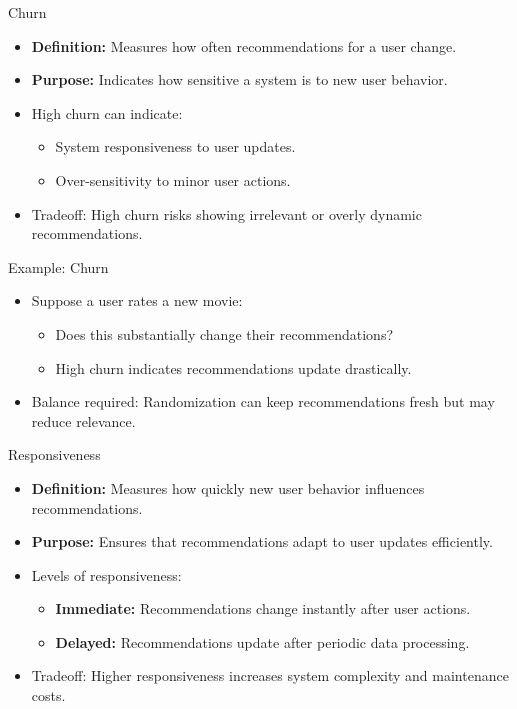 \documentclass{beamer}
\begin{document}
\begin{frame}{Churn}
\begin{itemize}
    \item \textbf{Definition:} Measures how often recommendations for a user change.
    \item \textbf{Purpose:} Indicates how sensitive a system is to new user behavior.
    \item High churn can indicate:
    \begin{itemize}
        \item System responsiveness to user updates.
        \item Over-sensitivity to minor user actions.
    \end{itemize}
    \item Tradeoff: High churn risks showing irrelevant or overly dynamic recommendations.
\end{itemize}
\end{frame}

\begin{frame}{Example: Churn}
\begin{itemize}
    \item Suppose a user rates a new movie:
    \begin{itemize}
        \item Does this substantially change their recommendations?
        \item High churn indicates recommendations update drastically.
    \end{itemize}
    \item Balance required: Randomization can keep recommendations fresh but may reduce relevance.
\end{itemize}
\end{frame}

\begin{frame}{Responsiveness}
\begin{itemize}
    \item \textbf{Definition:} Measures how quickly new user behavior influences recommendations.
    \item \textbf{Purpose:} Ensures that recommendations adapt to user updates efficiently.
    \item Levels of responsiveness:
    \begin{itemize}
        \item \textbf{Immediate:} Recommendations change instantly after user actions.
        \item \textbf{Delayed:} Recommendations update after periodic data processing.
    \end{itemize}
    \item Tradeoff: Higher responsiveness increases system complexity and maintenance costs.
\end{itemize}
\end{frame}
\end{document}
